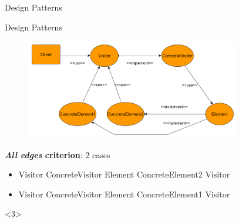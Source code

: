 \documentclass{beamer}
\theoremstyle{definition}
\begin{document}
\begin{section}{Design Patterns}
\begin{subsection}{Design Patterns}
\begin{frame}
{\begin{figure}[!h]
	\centering
	\includegraphics[width=0.84\textwidth]{./Visitor/ClassDependencyGraph.png}
	\label{Videpengraph}
\end{figure}
\textbf{\textit{All edges} criterion}: 2 cases
\begin{itemize}
	\item Visitor ConcreteVisitor Element ConcreteElement2 Visitor
	\item Visitor ConcreteVisitor Element ConcreteElement1 Visitor	
\end{itemize}}<3>
	\end{frame}
\end{subsection}
\end{section}
\end{document}
